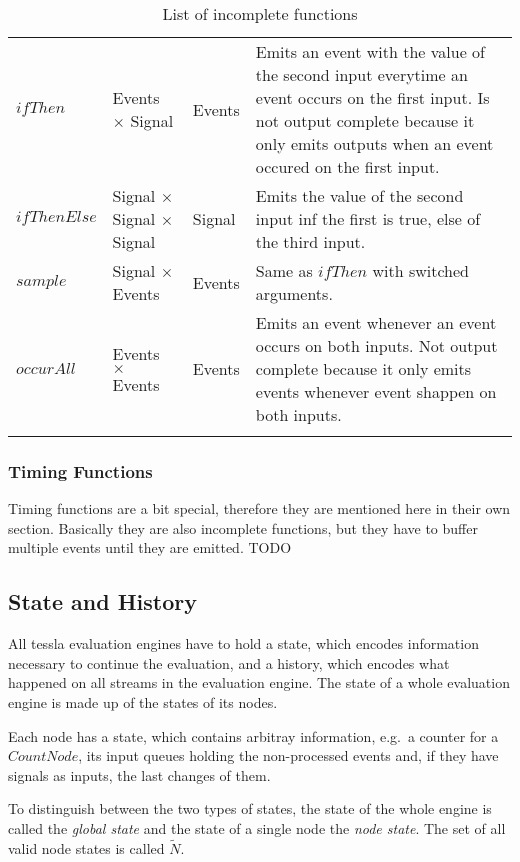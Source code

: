 \begin{longtable}{lp{3cm}lp{6cm}}
  \(\mathit{ifThen}\)           & Events \(\times\) Signal  & Events  & Emits an event with the value of the second input everytime an event occurs on the first input. Is not output complete because it only emits outputs when an event occured on the first input. \\
  \(\mathit{ifThenElse}\)       & Signal \(\times\) Signal \newline \(\times\) Signal  & Signal  & Emits the value of the second input inf the first is true, else of the third input.\\
  \(\mathit{sample}\)           & Signal \(\times\) Events  & Events  & Same as \(\mathit{ifThen}\) with switched arguments. \\
  \(\mathit{occurAll}\)         & Events \(\times\) Events  & Events  & Emits an event whenever an event occurs on both inputs. Not output complete because it only emits events whenever event shappen on both inputs.\\
  \caption{List of incomplete functions}
\label{table:incomplete_functions}
\end{longtable}

\subsubsection{Timing Functions}

Timing functions are a bit special, therefore they are mentioned here in their own section.
Basically they are also incomplete functions, but they have to buffer multiple events until they are emitted.
TODO

\subsection{State and History}
\label{sec:concepts:def:state}

All \gls{tessla} evaluation engines have to hold a state, which encodes information necessary to continue the evaluation, and a history, which encodes what happened on all streams in the evaluation engine.
The state of a whole evaluation engine is made up of the states of its nodes.

Each node has a state, which contains arbitray information, e.g.\ a counter for a \(\mathit{CountNode}\), its input queues holding the non-processed events and, if they have signals as inputs, the last changes of them.

To distinguish between the two types of states, the state of the whole engine is called the \emph{global state} and the state of a single node the \emph{node state}.
The set of all valid node states is called \(\widetilde{N}\).

